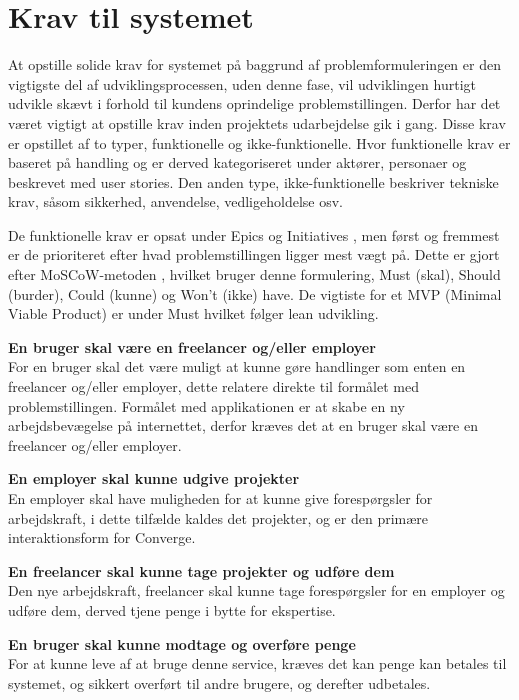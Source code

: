 \section{Krav til systemet}

At opstille solide krav for systemet på baggrund af problemformuleringen er den vigtigste del af udviklingsprocessen, uden denne fase, vil udviklingen hurtigt udvikle skævt i forhold til kundens oprindelige problemstillingen. Derfor har det været vigtigt at opstille krav inden projektets udarbejdelse gik i gang. Disse krav er opstillet af to typer, funktionelle og ikke-funktionelle. Hvor funktionelle krav er baseret på handling og er derved kategoriseret under aktører, personaer og beskrevet med user stories. Den anden type, ikke-funktionelle beskriver tekniske krav, såsom sikkerhed, anvendelse, vedligeholdelse osv. 

De funktionelle krav er opsat under Epics og Initiatives , men først og fremmest er de prioriteret efter hvad problemstillingen ligger mest vægt på. Dette er gjort efter MoSCoW-metoden , hvilket bruger denne formulering, Must (skal), Should (burder), Could (kunne) og Won't (ikke) have. De vigtiste for et MVP (Minimal Viable Product) er under Must hvilket følger lean udvikling. 

\textbf{En bruger skal være en freelancer og/eller employer} \\
For en bruger skal det være muligt at kunne gøre handlinger som enten en freelancer og/eller employer, dette relatere direkte til formålet med problemstillingen. Formålet med applikationen er at skabe en ny arbejdsbevægelse på internettet, derfor kræves det at en bruger skal være en freelancer og/eller employer.

\textbf{En employer skal kunne udgive projekter} \\
En employer skal have muligheden for at kunne give forespørgsler for arbejdskraft, i dette tilfælde kaldes det projekter, og er den primære interaktionsform for Converge.

\textbf{En freelancer skal kunne tage projekter og udføre dem} \\
Den nye arbejdskraft, freelancer skal kunne tage forespørgsler for en employer og udføre dem, derved tjene penge i bytte for ekspertise.

\textbf{En bruger skal kunne modtage og overføre penge} \\
For at kunne leve af at bruge denne service, kræves det kan penge kan betales til systemet, og sikkert overført til andre brugere, og derefter udbetales.

